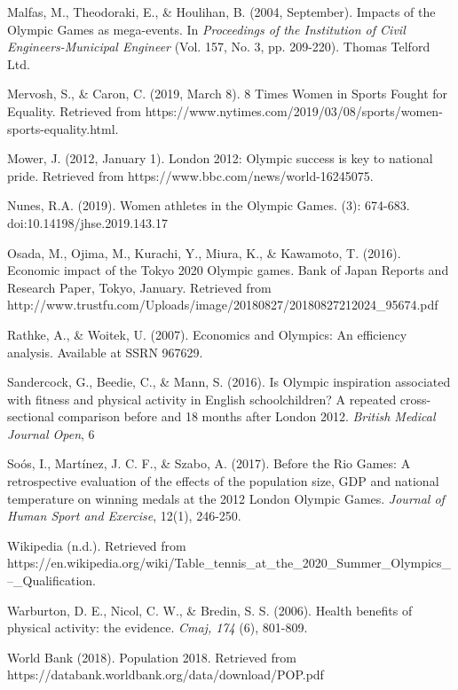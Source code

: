 \documentclass[12pt]{article}
\begin{document}
\begin{hangparas}{.25in}{1}
Malfas, M., Theodoraki, E., \& Houlihan, B. (2004, September). Impacts of the Olympic Games as mega-events. In \textit {Proceedings of the Institution of Civil Engineers-Municipal Engineer} (Vol. 157, No. 3, pp. 209-220). Thomas Telford Ltd.

Mervosh, S., \& Caron, C. (2019, March 8). 8 Times Women in Sports Fought for Equality. Retrieved from https://www.nytimes.com/2019/03/08/sports/women-sports-equality.html.

Mower, J. (2012, January 1). London 2012: Olympic success is key to national pride. Retrieved from https://www.bbc.com/news/world-16245075.

Nunes, R.A. (2019). Women athletes in the Olympic Games. (3): 674-683. doi:10.14198/jhse.2019.143.17

Osada, M., Ojima, M., Kurachi, Y., Miura, K., \& Kawamoto, T. (2016). Economic impact of the Tokyo 2020 Olympic games. Bank of Japan Reports and Research Paper, Tokyo, January. Retrieved from http://www.trustfu.com/Uploads/image/20180827/20180827212024_95674.pdf 

Rathke, A., \& Woitek, U. (2007). Economics and Olympics: An efficiency analysis. Available at SSRN 967629.

 Sandercock, G., Beedie, C., \& Mann, S. (2016). Is Olympic inspiration associated with fitness and physical activity in English schoolchildren? A repeated cross-sectional comparison before and 18 months after London 2012. \textit {British Medical Journal Open}, 6

Soós, I., Martínez, J. C. F., \& Szabo, A. (2017). Before the Rio Games: A retrospective evaluation of the effects of the population size, GDP and national temperature on winning medals at the 2012 London Olympic Games. \textit {Journal of Human Sport and Exercise}, 12(1), 246-250.

Wikipedia (n.d.). Retrieved from  https://en.wikipedia.org/wiki/Table_tennis_at_the_2020_Summer_Olympics_–_Qualification.

Warburton, D. E., Nicol, C. W., \& Bredin, S. S. (2006). Health benefits of physical activity: the evidence. \textit {Cmaj, 174} (6), 801-809.

World Bank (2018). Population 2018. Retrieved from https://databank.worldbank.org/data/download/POP.pdf 

\end{hangparas}
\end{document}
